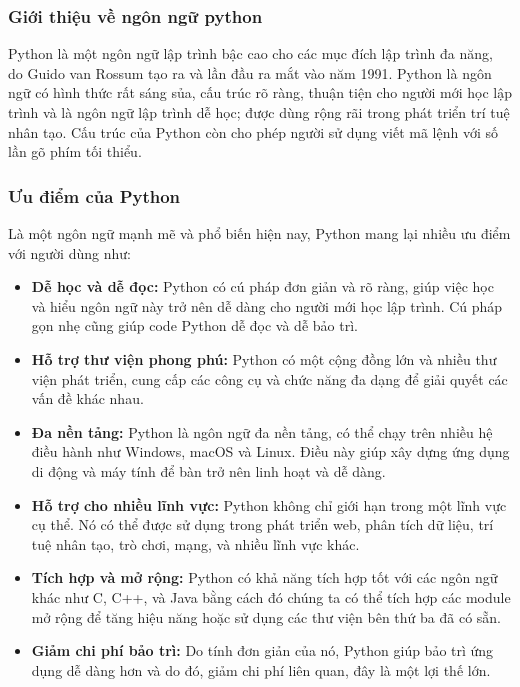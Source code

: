 \documentclass[a4paper]{article}
\begin{document}
\subsubsection{Giới thiệu về ngôn ngữ python}
Python là một ngôn ngữ lập trình bậc cao cho các mục đích lập trình đa năng, do Guido van Rossum tạo ra và lần đầu ra mắt vào năm 1991. Python là ngôn ngữ có hình thức rất sáng sủa, cấu trúc rõ ràng, thuận tiện cho người mới học lập trình và là ngôn ngữ lập trình dễ học; được dùng rộng rãi trong phát triển trí tuệ nhân tạo. Cấu trúc của Python còn cho phép người sử dụng viết mã lệnh với số lần gõ phím tối thiểu.
\subsubsection{Ưu điểm của Python}
Là một ngôn ngữ mạnh mẽ và phổ biến hiện nay, Python mang lại nhiều ưu điểm với người dùng như:
\vspace{-5pt}
\begin{itemize}
    \item \textbf{Dễ học và dễ đọc:} Python có cú pháp đơn giản và rõ ràng, giúp việc học và hiểu ngôn ngữ này trở nên dễ dàng cho người mới học lập trình. Cú pháp gọn nhẹ cũng giúp code Python dễ đọc và dễ bảo trì.
    \item \textbf{Hỗ trợ thư viện phong phú:} Python có một cộng đồng lớn và nhiều thư viện phát triển, cung cấp các công cụ và chức năng đa dạng để giải quyết các vấn đề khác nhau.
    \item \textbf{Đa nền tảng: } Python là ngôn ngữ đa nền tảng, có thể chạy trên nhiều hệ điều hành như Windows, macOS và Linux. Điều này giúp xây dựng ứng dụng di động và máy tính để bàn trở nên linh hoạt và dễ dàng.
    \item \textbf{Hỗ trợ cho nhiều lĩnh vực: } Python không chỉ giới hạn trong một lĩnh vực cụ thể. Nó có thể được sử dụng trong phát triển web, phân tích dữ liệu, trí tuệ nhân tạo, trò chơi, mạng, và nhiều lĩnh vực khác.
    \item \textbf{Tích hợp và mở rộng: } Python có khả năng tích hợp tốt với các ngôn ngữ khác như C, C++, và Java bằng cách đó chúng ta có thể tích hợp các module mở rộng để tăng hiệu năng hoặc sử dụng các thư viện bên thứ ba đã có sẵn.
    \item \textbf{Giảm chi phí bảo trì: } Do tính đơn giản của nó, Python giúp bảo trì ứng dụng dễ dàng hơn và do đó, giảm chi phí liên quan, đây là một lợi thế lớn.
\end{itemize}
\end{document}
